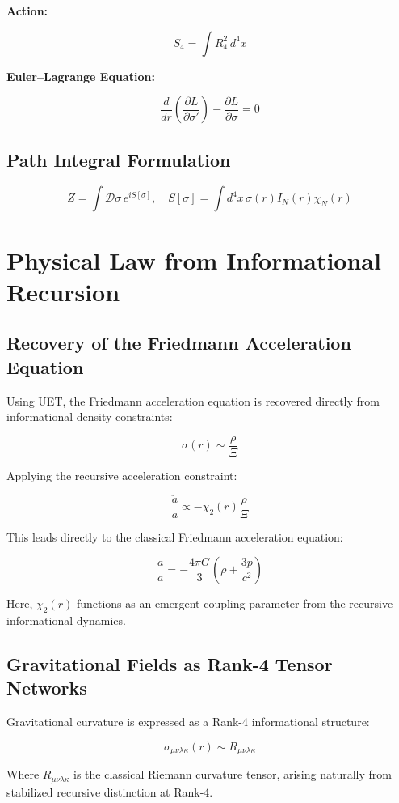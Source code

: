 \documentclass[12pt,a4paper]{article}
\begin{document}
\textbf{Action:}

\[
S_4 = \int R_4^2 \, d^4x
\]

\textbf{Euler–Lagrange Equation:}

\[
\frac{d}{dr} \left( \frac{\partial L}{\partial \sigma'} \right) - \frac{\partial L}{\partial \sigma} = 0
\]

\subsection{Path Integral Formulation}

\[
Z = \int \mathcal{D}\sigma \, e^{i S[\sigma]}, \quad S[\sigma] = \int d^4x \, \sigma(r) I_N(r) \chi_N(r)
\]
\section{Physical Law from Informational Recursion}

\subsection{Recovery of the Friedmann Acceleration Equation}

Using UET, the Friedmann acceleration equation is recovered directly from informational density constraints:

\[
\sigma(r) \sim \frac{\rho}{\Xi}
\]

Applying the recursive acceleration constraint:

\[
\frac{\ddot{a}}{a} \propto -\chi_2(r) \frac{\rho}{\Xi}
\]

This leads directly to the classical Friedmann acceleration equation:

\[
\frac{\ddot{a}}{a} = -\frac{4 \pi G}{3} \left( \rho + \frac{3p}{c^2} \right)
\]

Here, \(\chi_2(r)\) functions as an emergent coupling parameter from the recursive informational dynamics.

\subsection{Gravitational Fields as Rank-4 Tensor Networks}

Gravitational curvature is expressed as a Rank-4 informational structure:

\[
\sigma_{\mu\nu\lambda\kappa}(r) \sim R_{\mu\nu\lambda\kappa}
\]

Where \(R_{\mu\nu\lambda\kappa}\) is the classical Riemann curvature tensor, arising naturally from stabilized recursive distinction at Rank-4.
\end{document}
